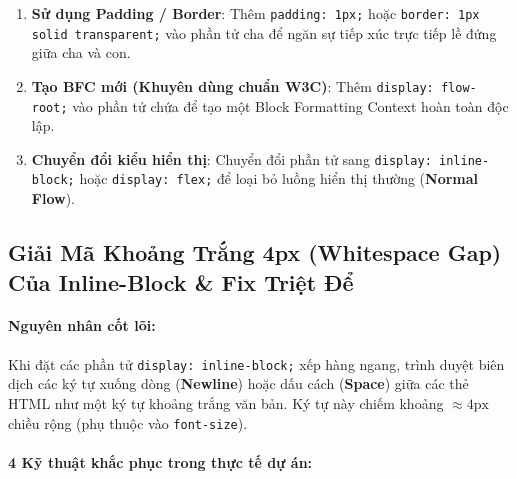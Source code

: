 \documentclass[11pt,oneside]{book}
\newcommand{\thd}[1]{\textcolor{white}{\textbf{\strut #1}}}
\newcommand{\codeinline}[1]{\textcolor{accentOrange}{\texttt{#1}}}
\newcommand{\term}[1]{\textbf{\textcolor{primaryBlue}{#1}}}
\begin{document}
\begin{tipBox}
\begin{enumerate}[leftmargin=1.5em, itemsep=4pt, parsep=0pt]
    \item \textbf{Sử dụng Padding / Border}: Thêm \codeinline{padding: 1px;} hoặc \codeinline{border: 1px solid transparent;} vào phần tử cha để ngăn sự tiếp xúc trực tiếp lề đứng giữa cha và con.
    \item \textbf{Tạo BFC mới (Khuyên dùng chuẩn W3C)}: Thêm \codeinline{display: flow-root;} vào phần tử chứa để tạo một Block Formatting Context hoàn toàn độc lập.
    \item \textbf{Chuyển đổi kiểu hiển thị}: Chuyển đổi phần tử sang \codeinline{display: inline-block;} hoặc \codeinline{display: flex;} để loại bỏ luồng hiển thị thường (\term{Normal Flow}).
\end{enumerate}
\end{tipBox}

\Needspace*{80pt}
\subsection{Giải Mã Khoảng Trắng 4px (Whitespace Gap) Của Inline-Block \& Fix Triệt Để}

\paragraph{Nguyên nhân cốt lõi:}
Khi đặt các phần tử \codeinline{display: inline-block;} xếp hàng ngang, trình duyệt biên dịch các ký tự xuống dòng (\term{Newline}) hoặc dấu cách (\term{Space}) giữa các thẻ HTML như một ký tự khoảng trắng văn bản. Ký tự này chiếm khoảng $\approx 4\text{px}$ chiều rộng (phụ thuộc vào \codeinline{font-size}).

\paragraph{4 Kỹ thuật khắc phục trong thực tế dự án:}
\begin{prettyTableBox}
\end{prettyTableBox}
\end{document}
